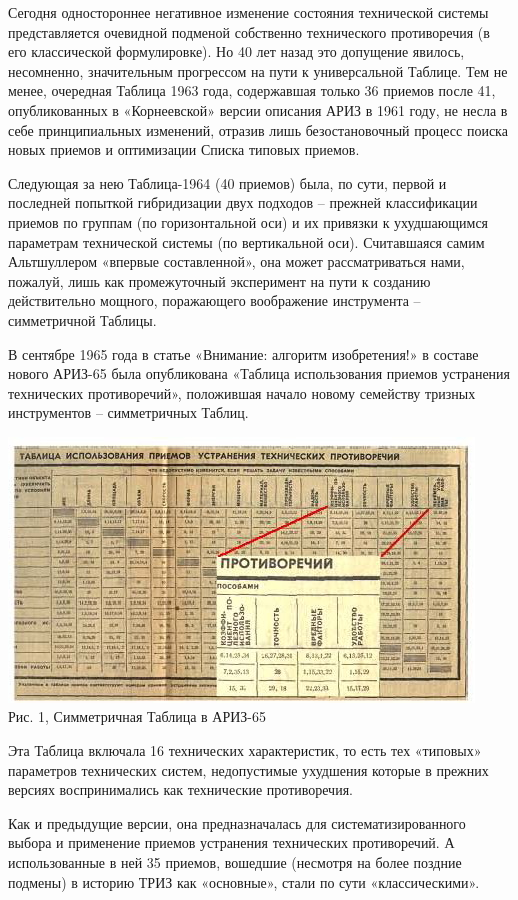 \documentclass[11pt,a4paper]{article}
\begin{document}
Сегодня одностороннее негативное изменение состояния технической системы
представляется очевидной подменой собственно технического противоречия (в его
классической формулировке). Но 40 лет назад это допущение явилось, несомненно,
значительным прогрессом на пути к универсальной Таблице. Тем не менее,
очередная Таблица 1963 года, содержавшая только 36 приемов после 41,
опубликованных в «Корнеевской» версии описания АРИЗ в 1961 году, не несла в
себе принципиальных изменений, отразив лишь безостановочный процесс поиска
новых приемов и оптимизации Списка типовых приемов.

Следующая за нею Таблица-1964 (40 приемов) была, по сути, первой и последней
попыткой гибридизации двух подходов -- прежней классификации приемов по
группам (по горизонтальной оси) и их привязки к ухудшающимся параметрам
технической системы (по вертикальной оси). Считавшаяся самим Альтшуллером
«впервые составленной», она может рассматриваться нами, пожалуй, лишь как
промежуточный эксперимент на пути к созданию действительно мощного,
поражающего воображение инструмента -- симметричной Таблицы.

В сентябре 1965 года в статье «Внимание: алгоритм изобретения!»
\cite{Altshuller1965} в составе нового АРИЗ-65 была опубликована «Таблица
использования приемов устранения технических противоречий», положившая начало
новому семейству тризных инструментов -- симметричных Таблиц.

\begin{center}
  \includegraphics[width=.8\textwidth]{./11.jpg} \\
  Рис. 1, Симметричная Таблица в АРИЗ-65
\end{center}

Эта Таблица включала 16 технических характеристик, то есть тех «типовых»
параметров технических систем, недопустимые ухудшения которые в прежних
версиях воспринимались как технические противоречия.

Как и предыдущие версии, она предназначалась для систематизированного выбора и
применение приемов устранения технических противоречий. А использованные в ней
35 приемов, вошедшие (несмотря на более поздние подмены) в историю ТРИЗ как
«основные», стали по сути «классическими».
\end{document}

